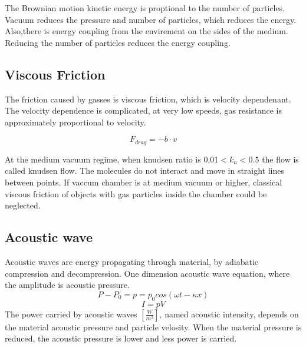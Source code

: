\documentclass[\main/master.tex]{subfiles}
\begin{document}
The Brownian motion kinetic energy is proptional to the number of particles. Vacuum reduces the pressure and number of particles, which reduces the energy. Also,there is energy coupling from the envirement on the sides of the medium. Reducing the number of particles reduces the energy coupling.

\subsection{Viscous Friction}
The friction caused by gasses is viscous friction, which is velocity dependenant. The velocity dependence is complicated, at very low speeds, gas resistance is approximately proportional to velocity. 

\begin{equation}
F_{drag} = -b\cdot v  \label{eqn:energy-mass-equivalence-relation}
\end{equation}

At the medium vacuum regime, when knudsen ratio is $0.01<k_n<0.5$ the flow is called knudsen flow. The molecules do not interact and move in straight lines between points. If vaccum chamber is at medium vacuum or higher, classical viscous friction of objects with gas particles inside the chamber could be neglected.


\subsection{Acoustic wave}
Acoustic waves are energy propagating through material, by adiabatic compression and decompression. One dimension acoustic wave equation, where the amplitude is acoustic pressure.
\begin{equation}
P-P_0 = p = p_0cos(\omega t -\kappa x)       \label{eqn:acoustic_pressure}
\end{equation}
\begin{equation}
I = pV      \label{eqn:acoustic_intensity}
\end{equation} 
The power carried by acoustic waves $[\frac{W}{m^2}]$, named acoustic intensity, depends on the material acoustic pressure and particle velosity. When the material pressure is reduced, the acoustic pressure is lower and less power is carried.
\end{document}

